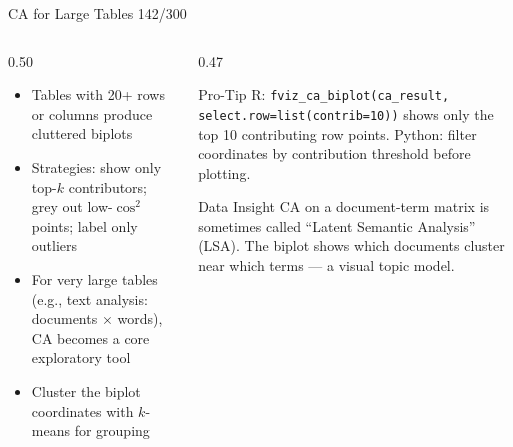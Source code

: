 \documentclass[10pt]{beamer}
\newcommand{\smark}[1]{\hfill{\scriptsize\color{codegray}#1}}
\begin{document}
\begin{frame}{CA for Large Tables}
\smark{142/300}
\begin{columns}[T]
\begin{column}{0.50\textwidth}
\begin{itemize}
    \item Tables with 20+ rows or columns produce cluttered biplots
    \item Strategies: show only top-$k$ contributors; grey out low-$\cos^2$ points; label only outliers
    \item For very large tables (e.g., text analysis: documents $\times$ words), CA becomes a core exploratory tool
    \item Cluster the biplot coordinates with $k$-means for grouping
\end{itemize}
\end{column}
\begin{column}{0.47\textwidth}
\begin{alertblock}{Pro-Tip}
    \scriptsize R: \texttt{fviz\_ca\_biplot(ca\_result, select.row=list(contrib=10))} shows only the top 10 contributing row points. Python: filter coordinates by contribution threshold before plotting.
\end{alertblock}
\vspace{0.1cm}
\begin{exampleblock}{Data Insight}
    \scriptsize CA on a document-term matrix is sometimes called ``Latent Semantic Analysis'' (LSA). The biplot shows which documents cluster near which terms --- a visual topic model.
\end{exampleblock}
\end{column}
\end{columns}
\end{frame}
\end{document}
